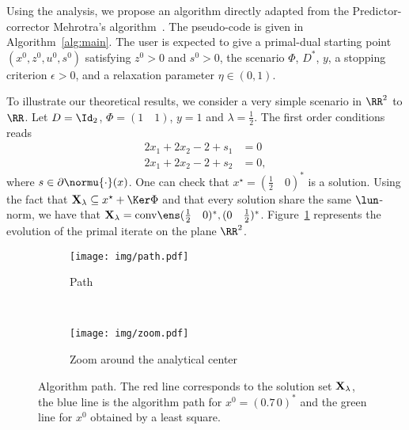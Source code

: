 Using the analysis, we propose an algorithm directly adapted from the Predictor-corrector Mehrotra's algorithm~\cite{Mehrotra}.
The pseudo-code is given in Algorithm~\ref{alg:main}.
The user is expected to give a primal-dual starting point $(x^0,z^0,u^0,s^0)$ satisfying $z^0 > 0$ and $s^0 > 0$, the scenario $\Phi$, $D^*$, $y$, a stopping criterion $\epsilon > 0$, and a relaxation parameter $\eta \in (0,1)$.

To illustrate our theoretical results, we consider a very simple scenario in $\RR^2$ to $\RR$.
Let $D = \Id_2$, $\Phi = (1 \quad 1)$, $y = 1$ and $\lambda = \frac{1}{2}$.
The first order conditions reads
\begin{align*}
  2 x_1 + 2 x_2 - 2 + s_1 &= 0 \\
  2 x_1 + 2 x_2 - 2 + s_2 &= 0 ,
\end{align*}
where $s \in \partial \normu{\cdot}(x)$.
One can check that $x^\star = (\frac{1}{2} \quad 0)^*$ is a solution.
Using the fact that $\Xl \subseteq x^\star + \Ker \Phi$ and that every solution share the same $\lun$-norm, we have that $\Xl = \conv{(\frac{1}{2} \quad 0)^*, (0 \quad \frac{1}{2})^*}$.
Figure~\ref{fig:path} represents the evolution of the primal iterate on the plane $\RR^2$.
\begin{figure}[h]
  \centering
  \begin{subfigure}[t]{0.45\textwidth}
    \centering
    \texttt{[image: img/path.pdf]}
    \caption{Path}
  \end{subfigure}%
  ~ 
  \begin{subfigure}[t]{0.45\textwidth}
    \centering
    \texttt{[image: img/zoom.pdf]}
    \caption{Zoom around the analytical center}
  \end{subfigure}
  \caption{Algorithm path. The red line corresponds to the solution set $\mathbf{X}_{\lambda}$, the blue line is the algorithm path for $x^0 = (0.7 \, 0)^*$ and the green line for $x^0$ obtained by a least square.}
  \label{fig:path}
\end{figure}

\renewcommand{\algorithmicrequire}{\textbf{Input:}}

